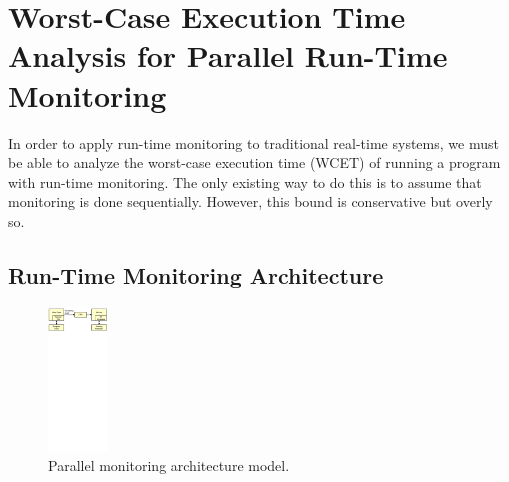 \chapter{Worst-Case Execution Time Analysis for Parallel Run-Time Monitoring}
\label{chap:monitoring_wcet}

In order to apply run-time monitoring to traditional real-time systems, we must
be able to analyze the worst-case execution time (WCET) of running a program
with run-time monitoring. The only existing way to do this is to assume that
monitoring is done sequentially. However, this bound is conservative but overly so.

\section{Run-Time Monitoring Architecture}

\begin{figure}
  \begin{center}
    \includegraphics[height=1.5in]{figs/monitoring_wcet/arch.pdf}
    \vspace{-0.2in}
    \caption{Parallel monitoring architecture model.}
    \label{fig:arch.model} 
    \vspace{-0.3in}
  \end{center}
\end{figure}

